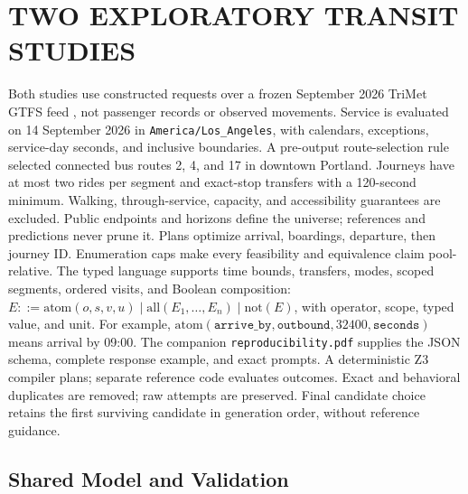 \documentclass[a4paper,twoside]{article}
\begin{document}
\section{\uppercase{Two Exploratory Transit Studies}}
\label{sec:setup}

\noindent Both studies use constructed requests over a frozen September 2026 TriMet GTFS feed \cite{trimet,gtfs}, not passenger records or observed movements. Service is evaluated on 14 September 2026 in \texttt{America/Los\_Angeles}, with calendars, exceptions, service-day seconds, and inclusive boundaries.
A pre-output route-selection rule selected connected bus routes 2, 4, and 17 in downtown Portland. Journeys have at most two rides per segment and exact-stop transfers with a 120-second minimum. Walking, through-service, capacity, and accessibility guarantees are excluded. Public endpoints and horizons define the universe; references and predictions never prune it. Plans optimize arrival, boardings, departure, then journey ID. Enumeration caps make every feasibility and equivalence claim pool-relative.
The typed language supports time bounds, transfers, modes, scoped segments, ordered visits, and Boolean composition: $E::=\mathrm{atom}(o,s,v,u)\mid\mathrm{all}(E_1,\ldots,E_n)\mid\mathrm{not}(E)$, with operator, scope, typed value, and unit. For example, $\mathrm{atom}(\texttt{arrive\_by},\texttt{outbound},32400,\texttt{seconds})$ means arrival by 09:00. The companion \texttt{reproducibility.pdf} supplies the JSON schema, complete response example, and exact prompts. A deterministic Z3 compiler plans; separate reference code evaluates outcomes. Exact and behavioral duplicates are removed; raw attempts are preserved. Final candidate choice retains the first surviving candidate in generation order, without reference guidance.


\subsection{Shared Model and Validation}
\end{document}
